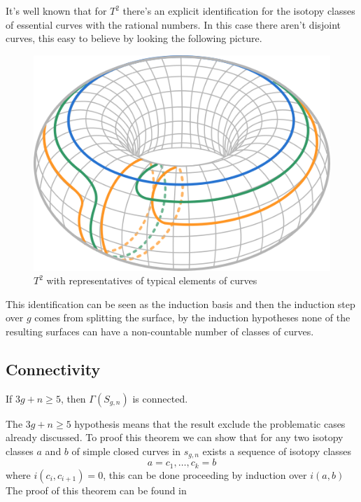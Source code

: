 It's well known that for $T^{2}$ there's an explicit identification for the isotopy classes of essential curves with the rational numbers. In this case there aren't disjoint curves, this easy to believe by looking the following picture.
\vspace{1cm}
\begin{figure}[h!]
	\centering
	\includegraphics[scale=0.7]{Figures/Torus.png}
	\caption{$T^{2}$ with representatives of typical elements of curves}
\end{figure}

This identification can be seen as the induction basis and then the induction step over $g$ comes from splitting the surface, by the induction hypotheses none of the resulting surfaces can have a non-countable number of classes of curves.

\subsection{Connectivity}
\begin{theorem}
If $3g+n\geq 5$, then $\Gamma(S_{g,n})$ is connected.
\end{theorem}

The $3g+n\geq 5$ hypothesis means that the result exclude the problematic cases already discussed. To proof this theorem we can show that for any two isotopy classes $a$ and $b$ of simple closed curves in $s_{g,n}$ exists a sequence of isotopy classes
$$a=c_{1},\dots,c_{k}=b$$
where $i(c_{i},c_{i+1})=0$, this can be done proceeding by induction over $i(a,b)$ The proof of this theorem can be found in \cite[Farb p.~93]{Farb} 

